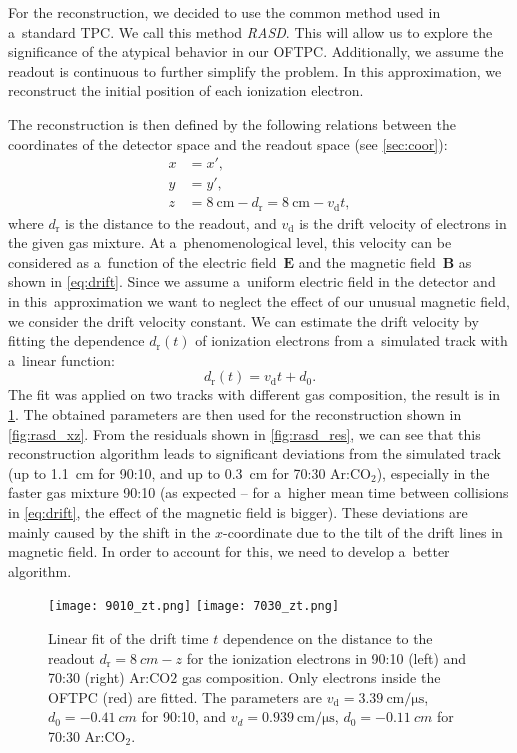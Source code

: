 		For the reconstruction, we decided to use the common method used in a~standard \ac{TPC}\cite{TPCs}. We call this method \textit{\acf{RASD}}. This will allow us to explore the significance of the atypical behavior in our \ac{OFTPC}. Additionally, we assume the readout is continuous to further simplify the problem. In this approximation, we reconstruct the initial position of each ionization electron.
		
		The reconstruction is then defined by the following relations between the coordinates of the detector space and the readout space (see \cref{sec:coor}):
			\begin{align}
				x &= x',\\
				y &= y',\\
				z &= \qty{8}{\cm} - d_\text{r} = \qty{8}{\cm} - v_\text{d} t,
			\end{align}
		where $d_\text{r}$ is the distance to the readout, and $v_\text{d}$ is the drift velocity of electrons in the given gas mixture. At a~phenomenological level, this velocity can be considered as a~function of the electric field~$\mathbf{E}$ and the magnetic field~$\mathbf{B}$ as shown in \cref{eq:drift}. Since we assume a~uniform electric field in the detector and in this~approximation we want to neglect the effect of our unusual magnetic field, we consider the drift velocity constant. We can estimate the drift velocity by fitting the dependence $d_\text{r}(t)$ of ionization electrons from a~simulated track with a~linear function:
			\begin{equation}
				d_\text{r}(t) = v_\text{d} t + d_0.
			\end{equation}
		The fit was applied on two tracks with different gas composition, the result is in \cref{fig:zt}. The obtained parameters are then used for the reconstruction shown in \cref{fig:rasd_xz}. From the residuals shown in \cref{fig:rasd_res}, we can see that this reconstruction algorithm leads to significant deviations from the simulated track (up to 1.1~cm for 90:10, and up to 0.3~cm for 70:30 Ar:CO$_2$), especially in the faster gas mixture 90:10 (as expected -- for a~higher mean time between collisions in \cref{eq:drift}, the effect of the magnetic field is bigger). These deviations are mainly caused by the shift in the $x$\nobreakdash-coordinate due to the tilt of the drift lines in magnetic field. In order to account for this, we need to develop a~better algorithm.
		
		\begin{figure}
			\centering
			\texttt{[image: 9010\_zt.png]}
			\hfill
			\texttt{[image: 7030\_zt.png]}
			\caption{Linear fit of the drift time $t$ dependence on the distance to the readout $d_\text{r} = \qty{8}{cm} - z$ for the ionization electrons in 90:10 (left) and 70:30 (right) Ar:CO$2$ gas composition. Only electrons inside the \ac{OFTPC} (red) are fitted. The parameters are $v_\text{d} = \qty{3.39}{\cm\per\us}$, $d_0 = -\qty{0.41}{cm}$ for 90:10, and $v_d = \qty{0.939}{\cm\per\us}$, $d_0 = -\qty{0.11}{cm}$ for 70:30 Ar:CO$_2$.}
			\label{fig:zt}
		\end{figure}
		
